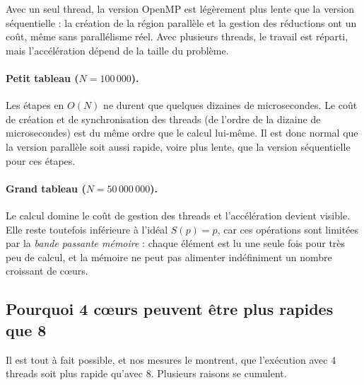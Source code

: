 \documentclass[11pt,a4paper]{article}
\begin{document}
Avec un seul thread, la version OpenMP est légèrement plus lente que la version séquentielle : la création de la région parallèle et la gestion des réductions ont un coût, même sans parallélisme réel. Avec plusieurs threads, le travail est réparti, mais l'accélération dépend de la taille du problème.

\paragraph{Petit tableau ($N = 100\,000$).} Les étapes en $O(N)$ ne durent que quelques dizaines de microsecondes. Le coût de création et de synchronisation des threads (de l'ordre de la dizaine de microsecondes) est du même ordre que le calcul lui-même. Il est donc normal que la version parallèle soit aussi rapide, voire plus lente, que la version séquentielle pour ces étapes.

\paragraph{Grand tableau ($N = 50\,000\,000$).} Le calcul domine le coût de gestion des threads et l'accélération devient visible. Elle reste toutefois inférieure à l'idéal $S(p) = p$, car ces opérations sont limitées par la \emph{bande passante mémoire} : chaque élément est lu une seule fois pour très peu de calcul, et la mémoire ne peut pas alimenter indéfiniment un nombre croissant de c\oe urs.

\subsection{Pourquoi 4 c\oe urs peuvent être plus rapides que 8}

Il est tout à fait possible, et nos mesures le montrent, que l'exécution avec 4 threads soit plus rapide qu'avec 8. Plusieurs raisons se cumulent.
\end{document}
